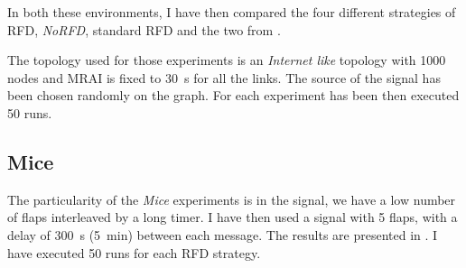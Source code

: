 In both these environments, I have then compared the four different strategies of
\ac{RFD}, \textit{NoRFD}, standard \ac{RFD} and the two from \cite{rfc7196}.

The topology used for those experiments is an \textit{Internet like} topology
with \num{1000} nodes and \ac{MRAI} is fixed to \SI{30}{\second} for all the links.
The source of the signal has been chosen randomly on the graph.
For each experiment has been then executed \num{50} runs.

\subsection{Mice}
\label{subsec:mice}

The particularity of the \textit{Mice} experiments is in the signal, we have
a low number of flaps interleaved by a long timer.
I have then used a signal with \num{5} flaps,  with a delay
of \SI{300}{\second} (\SI{5}{\minute}) between each message.
The results are presented in .
I have executed \num{50} runs for each \ac{RFD} strategy.

